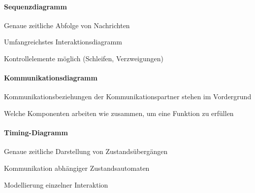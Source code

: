 \documentclass[a4paper]{article}
\begin{document}
\begin{multicols}{3}
  \paragraph{Sequenzdiagramm}
  \begin{itemize*}
    \item Genaue zeitliche Abfolge von Nachrichten
    \item Umfangreichstes Interaktionsdiagramm
    \item Kontrollelemente möglich (Schleifen, Verzweigungen)
  \end{itemize*}

  \paragraph{Kommunikationsdiagramm}
  \begin{itemize*}
    \item Kommunikationsbeziehungen der Kommunikationspartner stehen im Vordergrund
    \item Welche Komponenten arbeiten wie zusammen, um eine Funktion zu erfüllen
  \end{itemize*}

  \paragraph{Timing-Diagramm}
  \begin{itemize*}
    \item Genaue zeitliche Darstellung von Zustandsübergängen
    \item Kommunikation abhängiger Zustandsautomaten
    \item Modellierung einzelner Interaktion
  \end{itemize*}


\end{multicols}
\end{document}
